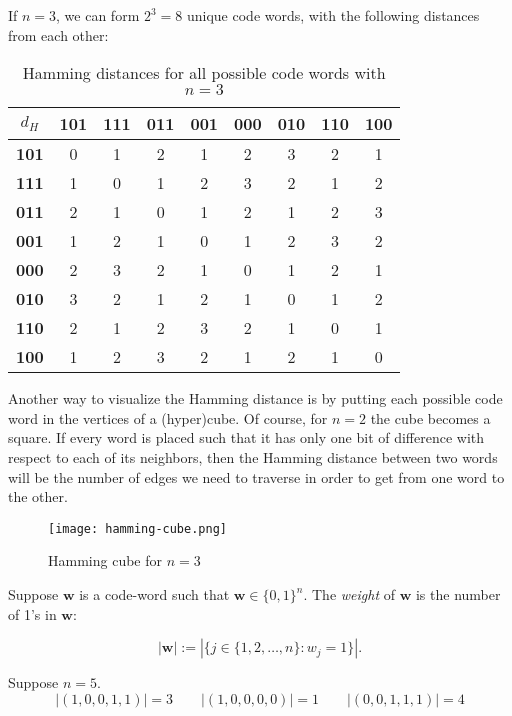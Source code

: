 \begin{example}
If $n = 3$, we can form $2^3=8$ unique code words, with the following distances from each other:

\begin{table}[!ht]
    \centering
    \begin{tabular}{|c|c|c|c|c|c|c|c|c|}
    \hline
        \textbf{$d_H$} & \textbf{101} & \textbf{111} & \textbf{011} & \textbf{001} & \textbf{000} & \textbf{010} & \textbf{110} & \textbf{100} \\ \hline
        \textbf{101} & 0 & 1 & 2 & 1 & 2 & 3 & 2 & 1 \\ \hline
        \textbf{111} & 1 & 0 & 1 & 2 & 3 & 2 & 1 & 2 \\ \hline
        \textbf{011} & 2 & 1 & 0 & 1 & 2 & 1 & 2 & 3 \\ \hline
        \textbf{001} & 1 & 2 & 1 & 0 & 1 & 2 & 3 & 2 \\ \hline
        \textbf{000} & 2 & 3 & 2 & 1 & 0 & 1 & 2 & 1 \\ \hline
        \textbf{010} & 3 & 2 & 1 & 2 & 1 & 0 & 1 & 2 \\ \hline
        \textbf{110} & 2 & 1 & 2 & 3 & 2 & 1 & 0 & 1 \\ \hline
        \textbf{100} & 1 & 2 & 3 & 2 & 1 & 2 & 1 & 0 \\ \hline
    \end{tabular}
    \caption{Hamming distances for all possible code words with $n=3$}
\end{table}

Another way to visualize the Hamming distance is by putting each possible code word in the vertices of a (hyper)cube. Of course, for $n=2$ the cube becomes a square. If every word is placed such that it has only one bit of difference with respect to each of its neighbors, then the Hamming distance between two words will be the number of edges we need to traverse in order to get from one word to the other.

\begin{figure}
    \centering
    \texttt{[image: hamming-cube.png]}
\caption{Hamming cube for $n=3$}
\end{figure}

\end{example}

\begin{definition}
Suppose $\textbf{w}$ is a code-word such that $\textbf{w} \in \{0,1\}^n$. The \emph{weight} of $\textbf{w}$ is the number of 1's in $\textbf{w}$:

\begin{equation}
    |\textbf{w}| := |\{j \in \{1, 2, \ldots, n\} : w_j = 1\}|.
\end{equation}

\end{definition}
\begin{example}
Suppose $n=5$.
\begin{equation}
    |(1, 0, 0, 1, 1)| = 3 \quad\quad |(1, 0, 0, 0, 0)| = 1 \quad\quad |(0, 0, 1, 1, 1)| = 4
\end{equation}
\end{example}

